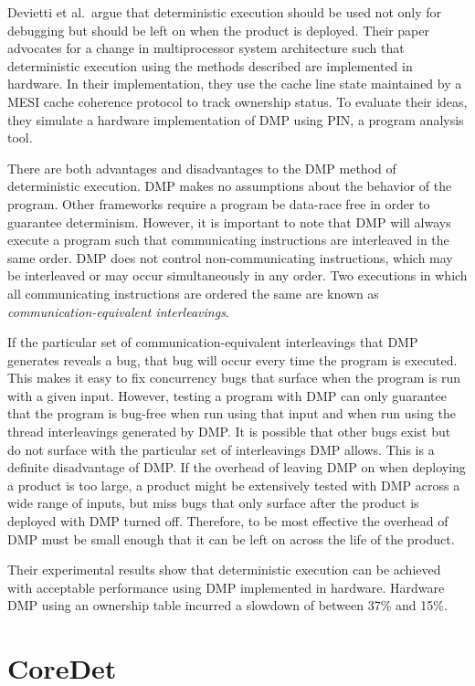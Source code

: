 Devietti et al.\ argue that deterministic execution should be used not
only for debugging but should be left on when the product is deployed.
Their paper advocates for a change in multiprocessor system
architecture such that deterministic execution using the methods
described are implemented in hardware.  In their implementation, they
use the cache line state maintained by a MESI cache coherence protocol
to track ownership status.  To evaluate their ideas, they simulate a
hardware implementation of DMP using PIN, a program analysis tool.

There are both advantages and disadvantages to the DMP method of
deterministic execution.  DMP makes no assumptions about the behavior
of the program.  Other frameworks require a program be data-race free
in order to guarantee determinism.  However, it is important to note
that DMP will always execute a program such that communicating
instructions are interleaved in the same order.  DMP does not control
non-communicating instructions, which may be interleaved or may occur
simultaneously in any order.  Two executions in which all
communicating instructions are ordered the same are known as
\emph{communication-equivalent interleavings}.

If the particular set of communication-equivalent interleavings that
DMP generates reveals a bug, that bug will occur every time the
program is executed.  This makes it easy to fix concurrency bugs that
surface when the program is run with a given input.  However, testing
a program with DMP can only guarantee that the program is bug-free
when run using that input and when run using the thread interleavings
generated by DMP.  It is possible that other bugs exist but do not
surface with the particular set of interleavings DMP allows.  This is
a definite disadvantage of DMP.  If the overhead of leaving DMP on
when deploying a product is too large, a product might be extensively
tested with DMP across a wide range of inputs, but miss bugs that only
surface after the product is deployed with DMP turned off.  Therefore,
to be most effective the overhead of DMP must be small enough that it
can be left on across the life of the product.

Their experimental results show that deterministic execution can be
achieved with acceptable performance using DMP implemented in
hardware.  Hardware DMP using an ownership table incurred a slowdown
of between 37\% and 15\%.

\section{CoreDet}

